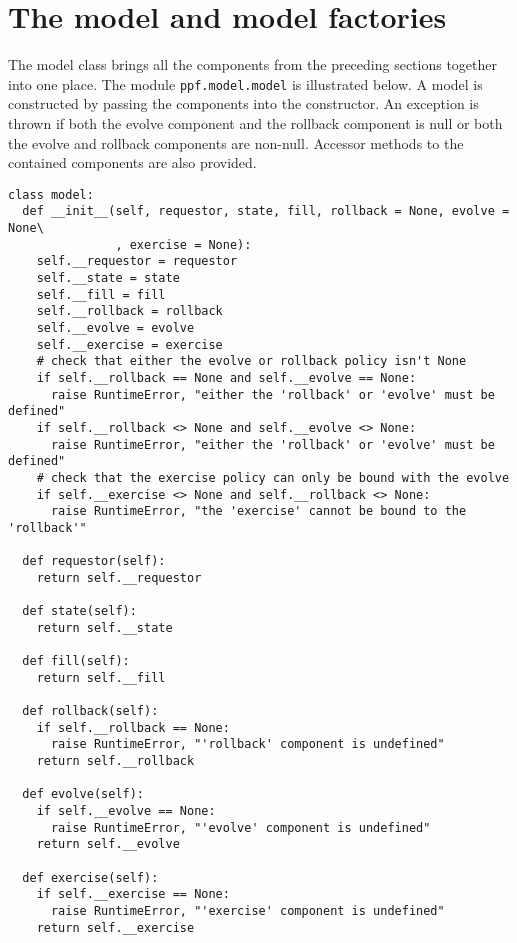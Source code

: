 \section{The model and model factories}
The model class brings all the components from the preceding sections
together into one place. The module \verb|ppf.model.model| is
illustrated below. A model is constructed by passing the components
into the constructor. An exception is thrown if both the evolve
component and the rollback component is null or both the evolve and
rollback components are non-null. Accessor methods to the contained
components are also provided.
\begin{verbatim}
class model:
  def __init__(self, requestor, state, fill, rollback = None, evolve = None\
               , exercise = None):
    self.__requestor = requestor
    self.__state = state
    self.__fill = fill
    self.__rollback = rollback
    self.__evolve = evolve
    self.__exercise = exercise
    # check that either the evolve or rollback policy isn't None
    if self.__rollback == None and self.__evolve == None:
      raise RuntimeError, "either the 'rollback' or 'evolve' must be defined"
    if self.__rollback <> None and self.__evolve <> None:
      raise RuntimeError, "either the 'rollback' or 'evolve' must be defined"
    # check that the exercise policy can only be bound with the evolve
    if self.__exercise <> None and self.__rollback <> None:
      raise RuntimeError, "the 'exercise' cannot be bound to the 'rollback'"

  def requestor(self):
    return self.__requestor

  def state(self):
    return self.__state

  def fill(self):
    return self.__fill

  def rollback(self):
    if self.__rollback == None:
      raise RuntimeError, "'rollback' component is undefined"
    return self.__rollback

  def evolve(self):
    if self.__evolve == None:
      raise RuntimeError, "'evolve' component is undefined"
    return self.__evolve

  def exercise(self):
    if self.__exercise == None:
      raise RuntimeError, "'exercise' component is undefined"
    return self.__exercise
\end{verbatim}

